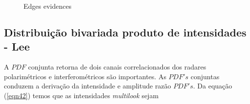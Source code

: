 \documentclass[remotesensing,article,submit,moreauthors,pdftex]{Definitions/mdpi}
\begin{document}
\begin{figure}[hbt]
	\centering
     \caption{Edges evidences}
     \label{evidencias_hh_hv_vv}
   \end{figure}
\subsection{Distribuição bivariada produto de intensidades - Lee } 

A $PDF$ conjunta retorna de dois canais correlacionados dos radares polarimétricos e interferométricos são importantes. As $PDF's$ conjuntas conduzem a derivação da intensidade e amplitude razão $PDF's$. Da equação (\ref{eqn42}) temos que as intensidades {\it multilook} sejam 
\end{document}
